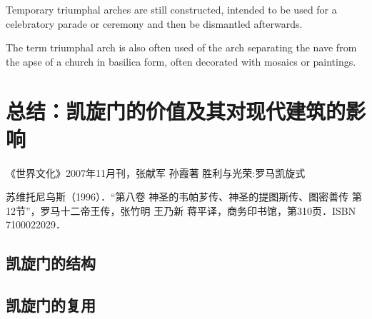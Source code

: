 \documentclass[a4paper,dvipdfm]{article}
\begin{document}
Temporary triumphal arches are still constructed, intended to be used
for a celebratory parade or ceremony and then be dismantled
afterwards.

The term triumphal arch is also often used of the arch separating the
nave from the apse of a church in basilica form, often decorated with
mosaics or paintings.



\section{总结：凯旋门的价值及其对现代建筑的影响}

\appendix{}
《世界文化》2007年11月刊，张献军 孙霞著 胜利与光荣:罗马凯旋式

苏维托尼乌斯（1996）．“第八卷 神圣的韦帕芗传、神圣的提图斯传、图密善传
第12节”，罗马十二帝王传，张竹明 王乃新 蒋平译，商务印书馆，第310页．ISBN
7100022029．

\subsection{凯旋门的结构}

\subsection{凯旋门的复用}




\end{document}
